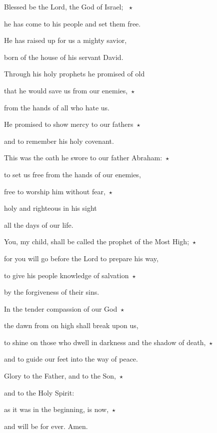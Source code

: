 \lettrine[loversize=0.15,lines=2]{B}{}lessed be the Lord, the God of Israel; ~$\star$~\nopagebreak

\hspace{2pt} he has come to his people and set them free.

\noindent He has raised up for us a mighty savior,

born of the house of his servant David.

\noindent Through his holy prophets he promised of old

  that he would save us from our enemies,~$\star$~\nopagebreak

  from the hands of all who hate us.

\noindent He promised to show mercy to our fathers~$\star$~\nopagebreak


and to remember his holy covenant.

\noindent This was the oath he swore to our father Abraham:~$\star$~\nopagebreak

to set us free from the hands of our enemies,

\noindent free to worship him without fear,~$\star$~\nopagebreak

holy and righteous in his sight

   all the days of our life.

\noindent You, my child, shall be called the prophet of the Most High;~$\star$~\nopagebreak

for you will go before the Lord to prepare his way,

\noindent to give his people knowledge of salvation~$\star$~\nopagebreak


by the forgiveness of their sins.

\noindent In the tender compassion of our God~$\star$~\nopagebreak


the dawn from on high shall break upon us,

\noindent to shine on those who dwell in darkness and the shadow of death,~$\star$~\nopagebreak

and to guide our feet into the way of peace.

\noindent Glory to the Father, and to the Son,~$\star$~\nopagebreak

and to the Holy Spirit:

\noindent as it was in the beginning, is now,~$\star$~\nopagebreak

and will be for ever. Amen.

